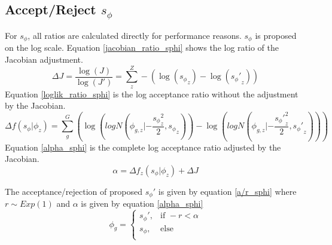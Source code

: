 \documentclass[11pt]{article}
\begin{document}
  \subsection{Accept/Reject $s_{\phi}$}
  For $s_{\phi}$, all ratios are calculated directly for performance reasons. $s_{\phi}$ is proposed on the log scale. Equation \ref{jacobian_ratio_sphi} shows the log ratio of the Jacobian adjustment. 
  \begin{equation}
    \Delta J = \frac{\log(J)}{\log(J')} = \sum_z^Z -(\log({s_{\phi}}_z) - \log({s_{\phi}'}_z))
    \label{jacobian_ratio_sphi}
  \end{equation}
  Equation \ref{loglik_ratio_sphi} is the log acceptance ratio without the adjustment by the Jacobian.
  \begin{equation}
    \Delta f(s_{\phi}|\phi_z) = \sum_g^G \left(\log(logN(\phi_{g,z} | -\frac{{s_{\phi}}_z^2}{2}, {s_{\phi}}_z)) - \log(logN(\phi_{g,z} | -\frac{{s_{\phi}'}_z^2}{2}, {s_{\phi}'}_z)) \right)
    \label{loglik_ratio_sphi}
  \end{equation}
  Equation \ref{alpha_sphi} is the complete log acceptance ratio adjusted by the Jacobian.
  \begin{equation}
    \alpha = \Delta f_z(s_{\phi}|\phi_z) + \Delta J
    \label{alpha_sphi}
  \end{equation}
  
 
  The acceptance/rejection of proposed $s_{\phi}'$ is given by equation \ref{a/r_sphi} where $r \sim Exp(1)$ and $\alpha$ is given by equation \ref{alpha_sphi}
  \begin{equation}
    \phi_g = 
    \begin{cases}
      s_{\phi}',	& \text{if } -r < \alpha \\
      s_{\phi},		& \text{else } \\
    \end{cases}
     \label{a/r_sphi}
  \end{equation}    
  
\end{document}
